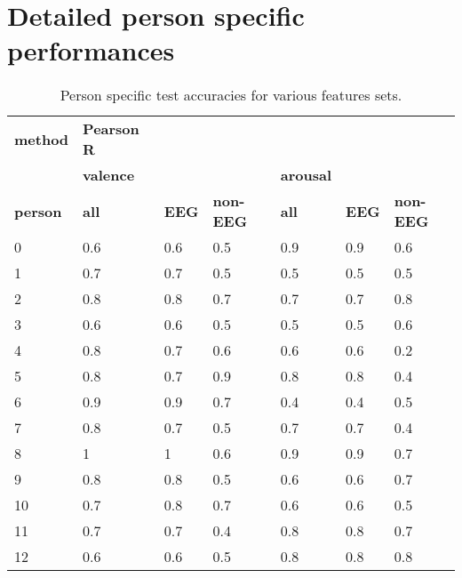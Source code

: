 \chapter{Detailed person specific performances} \label{persScores}
\begin{table}[]
\centering
\caption{Person specific test accuracies for various features sets.}
\begin{tabular}{l|lll|lll}
\textbf{\textbf{method}} & \textbf{Pearson R}   & 	 &         &         &     &         \\
                & \textbf{valence}              &           &         & \textbf{arousal} &     &         \\
\textbf{person}          & \textbf{all}                  & \textbf{EEG}       & \textbf{non-EEG} & \textbf{all}     & \textbf{EEG} & \textbf{non-EEG} \\ \hline 
 0               & 0.6                  & 0.6       & 0.5     & 0.9     & 0.9 & 0.6     \\
1               & 0.7                  & 0.7       & 0.5     & 0.5     & 0.5 & 0.5     \\
2               & 0.8                  & 0.8       & 0.7     & 0.7     & 0.7 & 0.8     \\
3               & 0.6                  & 0.6       & 0.5     & 0.5     & 0.5 & 0.6     \\
4               & 0.8                  & 0.7       & 0.6     & 0.6     & 0.6 & 0.2     \\
5               & 0.8                  & 0.7       & 0.9     & 0.8     & 0.8 & 0.4     \\
6               & 0.9                  & 0.9       & 0.7     & 0.4     & 0.4 & 0.5     \\
7               & 0.8                  & 0.7       & 0.5     & 0.7     & 0.7 & 0.4     \\
8               & 1                    & 1         & 0.6     & 0.9     & 0.9 & 0.7     \\
9               & 0.8                  & 0.8       & 0.5     & 0.6     & 0.6 & 0.7     \\
10              & 0.7                  & 0.8       & 0.7     & 0.6     & 0.6 & 0.5     \\
11              & 0.7                  & 0.7       & 0.4     & 0.8     & 0.8 & 0.7     \\
12              & 0.6                  & 0.6       & 0.5     & 0.8     & 0.8 & 0.8     \\

\end{tabular}
\end{table}
